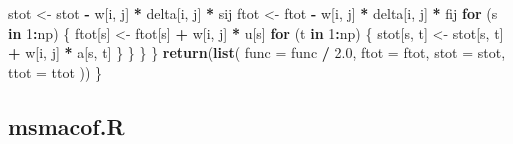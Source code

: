 \documentclass[
  12pt,
]{article}
\newenvironment{Shaded}{\begin{snugshade}}{\end{snugshade}}
\newcommand{\AttributeTok}[1]{\textcolor[rgb]{0.13,0.29,0.53}{#1}}
\newcommand{\ControlFlowTok}[1]{\textcolor[rgb]{0.13,0.29,0.53}{\textbf{#1}}}
\newcommand{\DecValTok}[1]{\textcolor[rgb]{0.00,0.00,0.81}{#1}}
\newcommand{\FloatTok}[1]{\textcolor[rgb]{0.00,0.00,0.81}{#1}}
\newcommand{\FunctionTok}[1]{\textcolor[rgb]{0.13,0.29,0.53}{\textbf{#1}}}
\newcommand{\NormalTok}[1]{#1}
\newcommand{\OtherTok}[1]{\textcolor[rgb]{0.56,0.35,0.01}{#1}}
\newcommand{\SpecialCharTok}[1]{\textcolor[rgb]{0.81,0.36,0.00}{\textbf{#1}}}
\begin{document}
\begin{Shaded}
\begin{Highlighting}[]
\NormalTok{      stot }\OtherTok{\textless{}{-}}\NormalTok{ stot }\SpecialCharTok{{-}}\NormalTok{ w[i, j] }\SpecialCharTok{*}\NormalTok{ delta[i, j] }\SpecialCharTok{*}\NormalTok{ sij}
\NormalTok{      ftot }\OtherTok{\textless{}{-}}\NormalTok{ ftot }\SpecialCharTok{{-}}\NormalTok{ w[i, j] }\SpecialCharTok{*}\NormalTok{ delta[i, j] }\SpecialCharTok{*}\NormalTok{ fij}
      \ControlFlowTok{for}\NormalTok{ (s }\ControlFlowTok{in} \DecValTok{1}\SpecialCharTok{:}\NormalTok{np) \{}
\NormalTok{        ftot[s] }\OtherTok{\textless{}{-}}\NormalTok{ ftot[s] }\SpecialCharTok{+}\NormalTok{ w[i, j] }\SpecialCharTok{*}\NormalTok{ u[s]}
        \ControlFlowTok{for}\NormalTok{ (t }\ControlFlowTok{in} \DecValTok{1}\SpecialCharTok{:}\NormalTok{np) \{}
\NormalTok{          stot[s, t] }\OtherTok{\textless{}{-}}\NormalTok{ stot[s, t] }\SpecialCharTok{+}\NormalTok{ w[i, j] }\SpecialCharTok{*}\NormalTok{ a[s, t]}
\NormalTok{        \}}
\NormalTok{      \}}
\NormalTok{    \}}
\NormalTok{  \}}
  \FunctionTok{return}\NormalTok{(}\FunctionTok{list}\NormalTok{(}
    \AttributeTok{func =}\NormalTok{ func }\SpecialCharTok{/} \FloatTok{2.0}\NormalTok{,}
    \AttributeTok{ftot =}\NormalTok{ ftot,}
    \AttributeTok{stot =}\NormalTok{ stot,}
    \AttributeTok{ttot =}\NormalTok{ ttot}
\NormalTok{  ))}
\NormalTok{\}}
\end{Highlighting}
\end{Shaded}

\subsection{msmacof.R}\label{msmacof.r}
\end{document}
